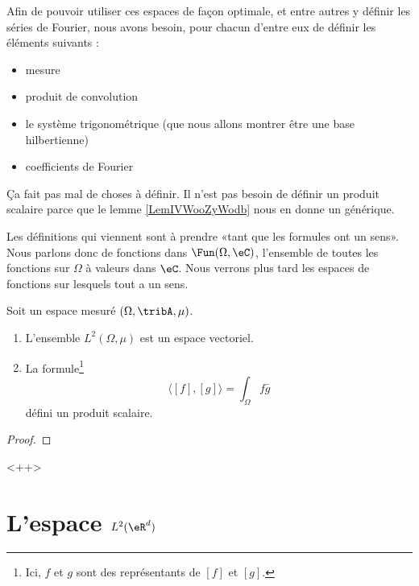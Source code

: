 Afin de pouvoir utiliser ces espaces de façon optimale, et entre autres y définir les séries de Fourier, nous avons besoin, pour chacun d'entre eux de définir les éléments suivants :
\begin{itemize}
    \item mesure
    \item produit de convolution
    \item le système trigonométrique (que nous allons montrer être une base hilbertienne)
    \item coefficients de Fourier
\end{itemize}
Ça fait pas mal de choses à définir. Il n'est pas besoin de définir un produit scalaire parce que le lemme \ref{LemIVWooZyWodb} nous en donne un générique.

Les définitions qui viennent sont à prendre «tant que les formules ont un sens». Nous parlons donc de fonctions dans \( \Fun(\Omega,\eC)\), l'ensemble de toutes les fonctions sur \( \Omega\) à valeurs dans \( \eC\). Nous verrons plus tard les espaces de fonctions sur lesquels tout a un sens.

\begin{proposition}     \label{PROPooRDZEooPQsanU}
    Soit un espace mesuré \( (\Omega,\tribA,\mu)\).
    \begin{enumerate}
        \item
            L'ensemble \( L^2(\Omega,\mu)\) est un espace vectoriel.
        \item
            La formule\footnote{Ici, \( f\) et \( g\) sont des représentants de \( [f]\) et \( [g]\).}
            \begin{equation}
                \langle [f], [g]\rangle =\int_{\Omega}f\bar g
            \end{equation}
            défini un produit scalaire.
    \end{enumerate}
\end{proposition}

\begin{proof}
    
\end{proof}
<++>

\section{L'espace \( L^2(\eR^d)\)}

